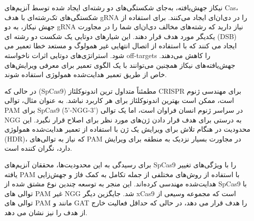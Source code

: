 \documentclass[12pt,a4paper,BCOR=.7cm,headsepline,bibliography=totoc]{report}
\begin{document}
نیکاز  جهش‌یافته‌، به‌جای شکستگی‌های دو رشته‌ای ایجاد شده توسط آنزیم‌های Cas، شکستگی‌های تک‌رشته‌ای با هدف gRNA را در دی‌ان‌ای ایجاد می‌کنند. برای استفاده از جهش نیکاز، به دو gRNA نیاز دارید که رشته‌های مخالف دی‌ان‌ای شما را در مجاورت یکدیگر مورد هدف قرار دهند. این شیارهای دوتایی یک شکست دو رشته ای (DSB) ایجاد می کنند که با استفاده از اتصال انتهایی غیر همولوگ  و مستعد خطا تعمیر می شود. استراتژی‌های دوتایی اثرات ناخواسته off-targets را کاهش می‌دهند. جهش‌یافته‌های نیکاز همچنین می‌توانند با یک الگوی تعمیر برای معرفی ویرایش‌های خاص از طریق تعمیر هدایت‌شده همولوژی  استفاده شوند.

در حالی که  (SpCas9) مطمئناً متداول ترین اندونوکلئاز CRISPR برای مهندسی ژنوم است، ممکن است بهترین اندونوکلئاز برای هر کاربرد نباشد. به عنوان مثال، توالی PAM برای SpCas9 (5'-NGG-3') در سراسر ژنوم انسان فراوان است، اما یک توالی NGG به درستی برای هدف قرار دادن ژن‌های مورد نظر برای اصلاح قرار نگیرد. این محدودیت در هنگام تلاش برای ویرایش یک ژن با استفاده از تعمیر هدایت‌شده همولوژی (HDR)، که نیاز به توالی‌های PAM در مجاورت بسیار نزدیک به منطقه برای ویرایش دارد، نگران کننده است.

برای رسیدگی به این محدودیت‌ها، محققان آنزیم‌های SpCas9 را با ویژگی‌های تغییر یافته PAM با استفاده از روش‌های مختلفی از جمله تکامل به کمک فاژ و جهش‌زایی هدایت‌شده مهندسی کرده‌اند. این منجر به توسعه چندین نوع مشتق شده از SpCas9 با توالی های PAM غیر NGG شد. جایگزین دیگر   xCas9 است که مجموعه وسیعی از توالی های PAM مانند  و GAT را هدف قرار می دهد، در حالی که حداقل فعالیت خارج از هدف را نیز نشان می دهد.
\end{document}
